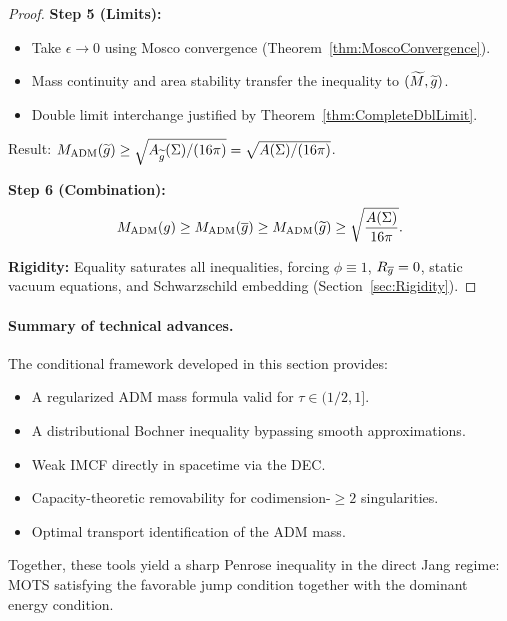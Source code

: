 \begin{proof}
\textbf{Step 5 (Limits):}
\begin{itemize}
    \item Take $\epsilon \to 0$ using Mosco convergence (Theorem~\ref{thm:MoscoConvergence}).
    \item Mass continuity and area stability transfer the inequality to $(\widetilde{M}, \widetilde{g})$.
    \item Double limit interchange justified by Theorem~\ref{thm:CompleteDblLimit}.
\end{itemize}
Result: $M_{\mathrm{ADM}}(\widetilde{g}) \ge \sqrt{A_{\widetilde{g}}(\Sigma)/(16\pi)} = \sqrt{A(\Sigma)/(16\pi)}$.

\textbf{Step 6 (Combination):}
\begin{equation}
    M_{\mathrm{ADM}}(g) \ge M_{\mathrm{ADM}}(\overline{g}) \ge M_{\mathrm{ADM}}(\widetilde{g}) \ge \sqrt{\frac{A(\Sigma)}{16\pi}}.
\end{equation}

\textbf{Rigidity:} Equality saturates all inequalities, forcing $\phi \equiv 1$, $R_{\overline{g}} = 0$, static vacuum equations, and Schwarzschild embedding (Section~\ref{sec:Rigidity}).
\end{proof}

\paragraph{Summary of technical advances.}
The conditional framework developed in this section provides:
\begin{itemize}
    \item A regularized ADM mass formula valid for $\tau \in (1/2, 1]$.
    \item A distributional Bochner inequality bypassing smooth approximations.
    \item Weak IMCF directly in spacetime via the DEC.
    \item Capacity-theoretic removability for codimension-$\ge 2$ singularities.
    \item Optimal transport identification of the ADM mass.
\end{itemize}
Together, these tools yield a sharp Penrose inequality in the direct Jang regime: MOTS satisfying the favorable jump condition together with the dominant energy condition.

